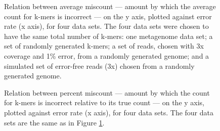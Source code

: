 \documentclass{article}
\begin{document}
\begin{figure}
\caption{Relation between average miscount --- amount by which
the average count for k-mers is incorrect --- on the y axis, plotted against
error rate (x axis), for four data sets.  The four data
sets were chosen to have the same total number of k-mers: one
metagenome data set; a set of randomly generated k-mers; a set
of reads, chosen with 3x coverage and 1\% error, from a randomly generated
genome; and a simulated set of error-free reads (3x) chosen from a randomly
generated genome.}
\label{average_offset_vs_fpr}
\end{figure}

\begin{figure}
\caption{Relation between percent miscount --- amount by which
the count for k-mers is incorrect relative to its true count --- on the y axis, plotted against
error rate (x axis), for four data sets.  The four data
sets are the same as in Figure \ref{average_offset_vs_fpr}.}
\label{percent_offset_vs_fpr}
\end{figure}
\end{document}

